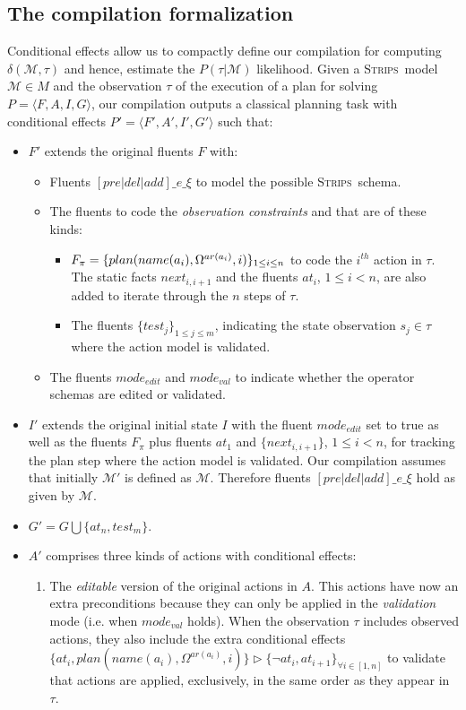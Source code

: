 \documentclass[letterpaper]{article} %
\newcommand{\tup}[1]{{\langle #1 \rangle}}
\newcommand{\strips}{\textsc{Strips}}     %
\begin{document}
\subsection{The compilation formalization}
Conditional effects allow us to compactly define our compilation for computing $\delta(\mathcal{M},\tau)$ and hence, estimate the $P(\tau|\mathcal{M})$ likelihood. Given a \strips\ model $\mathcal{M}\in M$ and the observation $\tau$ of the execution of a plan for solving $P=\tup{F,A,I,G}$, our compilation outputs a classical planning task with conditional effects $P'=\tup{F',A',I',G'}$ such that:
\begin{itemize}
\item $F'$ extends the original fluents $F$ with:
\begin{itemize}
\item Fluents $[pre|del|add]\_e\_\xi$ to model the possible \strips\ schema. 
\item The fluents to code the {\em observation constraints} and that are of these kinds:
\begin{itemize}
\item $F_{\pi}=\{plan(name(a_i),\Omega^{ar(a_i)},i)\}_{\small 1\leq i\leq n}$ to code the $i^{th}$ action in $\tau$. The static facts $next_{i,i+1}$ and the fluents $at_i$, {\small $1\leq i< n$}, are also added to iterate through the $n$ steps of $\tau$.
\item The fluents $\{test_j\}_{1\leq j\leq m}$, indicating the state observation $s_j\in\tau$ where the action model is validated.
\end{itemize}
\item The fluents $mode_{edit}$ and $mode_{val}$ to indicate whether the operator schemas are edited or validated.
\end{itemize}
\item $I'$ extends the original initial state $I$ with the fluent $mode_{edit}$ set to true as well as the fluents $F_{\pi}$ plus fluents $at_1$ and $\{next_{i,i+1}\}$, {\small $1\leq i<n$}, for tracking the plan step where the action model is validated. Our compilation assumes that initially $\mathcal{M}'$ is defined as $\mathcal{M}$. Therefore fluents $[pre|del|add]\_e\_\xi$ hold as given by $\mathcal{M}$.

\item $G'=G\bigcup\{at_n,test_m\}$.
\item $A'$ comprises three kinds of actions with conditional effects:
\begin{enumerate}
\item The {\em editable} version of the original actions in $A$. This actions have now an extra preconditions because they can only be applied in the {\em validation} mode (i.e. when $mode_{val}$ holds). When the observation $\tau$ includes observed actions, they also include the extra conditional effects $\{at_{i},plan(name(a_i),\Omega^{ar(a_i)},i)\}\rhd\{\neg at_{i},at_{i+1}\}_{\forall i\in [1,n]}$ to validate that actions are applied, exclusively, in the same order as they appear in $\tau$.\\


\end{enumerate}
\end{itemize}
\end{document}
